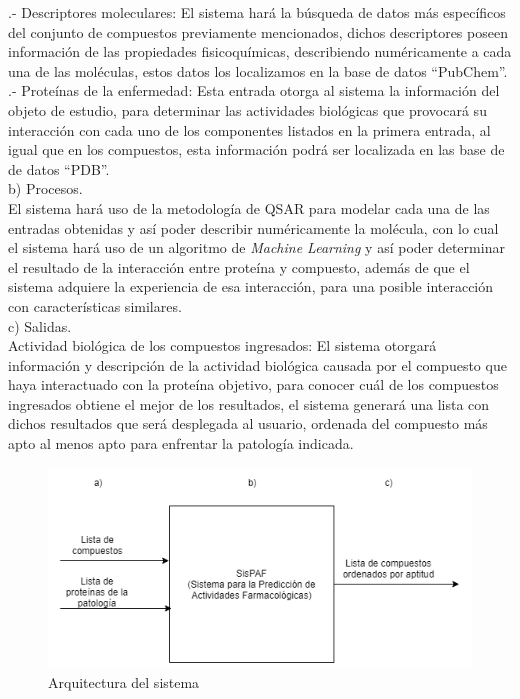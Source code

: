 .- Descriptores moleculares: El sistema hará la búsqueda de datos más específicos del conjunto de compuestos previamente mencionados, dichos descriptores poseen información de las propiedades fisicoquímicas, describiendo numéricamente a cada una de las moléculas, estos datos los localizamos en la base de datos “PubChem”.\\

.- Proteínas de la enfermedad: Esta entrada otorga al sistema la información del objeto de estudio, para determinar las actividades biológicas que provocará su interacción con cada uno de los componentes listados en la primera entrada, al igual que en los compuestos, esta información podrá ser localizada en las base de de datos “PDB”.\\

 b)	Procesos.\\
El sistema hará uso de la metodología de QSAR para modelar cada una de las entradas obtenidas y así poder describir numéricamente la molécula, con lo cual el sistema hará  uso de un algoritmo de \textit{Machine Learning} y así poder determinar el resultado de la interacción entre proteína y compuesto, además de que el sistema adquiere la experiencia de esa interacción, para una posible interacción con características similares.\\

c) 	Salidas.\\
Actividad biológica de los compuestos ingresados: El sistema otorgará información y descripción de la actividad biológica causada por el compuesto que haya interactuado con la proteína objetivo, para conocer cuál de los compuestos ingresados obtiene el mejor de los resultados, el sistema generará una lista con dichos resultados que será desplegada al usuario, ordenada del compuesto más apto al menos apto para enfrentar la patología indicada.
\begin{figure}[H]
    \centering
    \includegraphics[scale=0.8]{Capitulo1/figuras/arquitectura.png}
    \caption{Arquitectura del sistema}
    \label{arq}
\end{figure}
